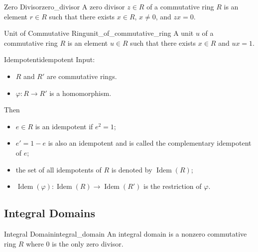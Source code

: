 \documentclass{article}
\begin{document}
\begin{definition}{Zero Divisor}{zero_divisor}
    A zero divisor $z\in R$ of a commutative ring $R$ is an element $r\in R$ such that there exists $x\in R$, $x\neq 0$, and $zx=0$.
\end{definition}

\begin{definition}{Unit of Commutative Ring}{unit_of_commutative_ring}
    A unit $u$ of a commutative ring $R$ is an element $u\in R$ such that there exists $x\in R$ and $ux=1$.
\end{definition}

\begin{definition}{Idempotent}{idempotent}
    Input:
    \begin{itemize}
        \item $R$ and $R'$ are commutative rings.
        \item $\varphi: R\rightarrow R'$ is a homomorphism.
    \end{itemize}
    Then
    \begin{itemize}
        \item $e\in R$ is an idempotent if $e^2 = 1$;
        \item $e'=1-e$ is also an idempotent and is called the complementary idempotent of $e$;
        \item the set of all idempotents of $R$ is denoted by $\operatorname{Idem}(R)$;
        \item $\operatorname{Idem}(\varphi): \operatorname{Idem}(R) \rightarrow \operatorname{Idem}(R')$ is the restriction of $\varphi$.
    \end{itemize}
\end{definition}

\subsection{Integral Domains}

\begin{definition}{Integral Domain}{integral_domain}
    An integral domain is a nonzero commutative ring $R$ where $0$ is the only zero divisor.
\end{definition}
\end{document}
